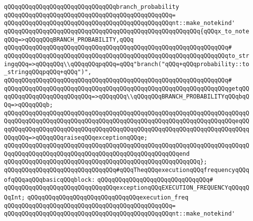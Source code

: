 \verb|qQQqqQQqqQQqqQQqqQQqqQQqqQQqqQQqbranch_probability|\newline
\verb|qQQqqQQqqQQqqQQqqQQqqQQqqQQqqQQqqQQqqQQqqQQqqQQq=|\newline
\verb|qQQqqQQqqQQqqQQqqQQqqQQqqQQqqQQqqQQqqQQqqQQqqQQqnt::make_notekind'|\newline
\verb|qQQqqQQqqQQqqQQqqQQqqQQqqQQqqQQqqQQqqQQqqQQqqQQqqQQqqQQq{qQQqx_to_noteqQQq=>qQQqqQQqBRANCH_PROBABILITY,qQQq|\newline
\verb|qQQqqQQqqQQqqQQqqQQqqQQqqQQqqQQqqQQqqQQqqQQqqQQqqQQqqQQqqQQqqQQq#|\newline
\verb|qQQqqQQqqQQqqQQqqQQqqQQqqQQqqQQqqQQqqQQqqQQqqQQqqQQqqQQqqQQqqQQqto_stringqQQq=>qQQqqQQq\\qQQqqQQqpqQQq=qQQq"branch("qQQq+qQQqprobability::to_stringqQQqpqQQq+qQQq")",|\newline
\verb|qQQqqQQqqQQqqQQqqQQqqQQqqQQqqQQqqQQqqQQqqQQqqQQqqQQqqQQqqQQqqQQq#|\newline
\verb|qQQqqQQqqQQqqQQqqQQqqQQqqQQqqQQqqQQqqQQqqQQqqQQqqQQqqQQqqQQqqQQqgetqQQqqQQqqQQqqQQqqQQqqQQqqQQq=>qQQqqQQq\\qQQqqQQqBRANCH_PROBABILITYqQQqbqQQq=>qQQqqQQqb;|\newline
\verb|qQQqqQQqqQQqqQQqqQQqqQQqqQQqqQQqqQQqqQQqqQQqqQQqqQQqqQQqqQQqqQQqqQQqqQQqqQQqqQQqqQQqqQQqqQQqqQQqqQQqqQQqqQQqqQQqqQQqqQQqqQQqqQQqqQQqqQQqeqQQqqQQqqQQqqQQqqQQqqQQqqQQqqQQqqQQqqQQqqQQqqQQqqQQqqQQqqQQqqQQqqQQqqQQqqQQqqQQq=>qQQqqQQqraiseqQQqexceptionqQQqe;|\newline
\verb|qQQqqQQqqQQqqQQqqQQqqQQqqQQqqQQqqQQqqQQqqQQqqQQqqQQqqQQqqQQqqQQqqQQqqQQqqQQqqQQqqQQqqQQqqQQqqQQqqQQqqQQqqQQqqQQqqQQqqQQqend|\newline
\verb|qQQqqQQqqQQqqQQqqQQqqQQqqQQqqQQqqQQqqQQqqQQqqQQqqQQqqQQq};|\newline
\newline
\verb|qQQqqQQqqQQqqQQqqQQqqQQqqQQqqQQq#qQQqTheqQQqexecutionqQQqfrequencyqQQqofqQQqaqQQqbasicqQQqblock:|\newline
\verb|qQQqqQQqqQQqqQQqqQQqqQQqqQQqqQQq#|\newline
\verb|qQQqqQQqqQQqqQQqqQQqqQQqqQQqqQQqexceptionqQQqEXECUTION_FREQUENCYqQQqqQQqInt;|\newline
\newline
\verb|qQQqqQQqqQQqqQQqqQQqqQQqqQQqqQQqexecution_freq|\newline
\verb|qQQqqQQqqQQqqQQqqQQqqQQqqQQqqQQqqQQqqQQqqQQqqQQq=|\newline
\verb|qQQqqQQqqQQqqQQqqQQqqQQqqQQqqQQqqQQqqQQqqQQqqQQqnt::make_notekind'|\newline
